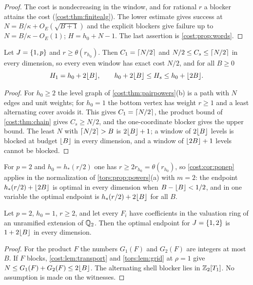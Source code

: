 \begin{proof}
The cost is nondecreasing in the window, and for rational $r$ a blocker attains the cost
(\cref{cost:thm:finitealg}). The lower estimate gives success at $N=B/\kappa+O_E(\sqrt{B+1})$
and the explicit blockers give failure up to $N=B/\kappa-O_E(1)$; $H=h_0+N-1$. The last
assertion is \cref{cost:prop:words}.
\end{proof}

\begin{corollary}[The first two powers, including $p=2$; \stU]\label{cost:cor:ponep}
Let $J=\{1,p\}$ and $r\ge\theta(r_{h_0})$. Then $C_1=\lceil N/2\rceil$ and
$N/2\le C_s\le\lceil N/2\rceil$ in every dimension, so every even window has exact cost $N/2$, and
for all $B\ge0$
\[
 H_1=h_0+2\lfloor B\rfloor,\qquad h_0+2\lfloor B\rfloor\le H_s\le h_0+\lfloor2B\rfloor .
\]
\end{corollary}

\begin{proof}
For $h_0\ge2$ the level graph of \cref{cost:thm:pairpowers}(b) is a path with $N$ edges and
unit weights; for $h_0=1$ the bottom vertex has weight $r\ge1$ and a least alternating cover
avoids it. This gives $C_1=\lceil N/2\rceil$, the product bound of \cref{cost:thm:chain} gives
$C_s\ge N/2$, and the one-coordinate blocker gives the upper bound. The least $N$ with
$\lceil N/2\rceil>B$ is $2\lfloor B\rfloor+1$; a window of $2\lfloor B\rfloor$ levels is blocked at budget
$\lfloor B\rfloor$ in every dimension, and a window of $\lfloor2B\rfloor+1$ levels cannot be blocked.
\end{proof}

For $p=2$ and $h_0=h_*(r/2)$ one has $r\ge2r_{h_0}=\theta(r_{h_0})$, so
\cref{cost:cor:ponep} applies in the normalization of \cref{tors:prop:powers}(a) with $m=2$:
the endpoint $h_*(r/2)+\lfloor2B\rfloor$ is optimal in every dimension when $B-\lfloor B\rfloor<1/2$, and
in one variable the optimal endpoint is $h_*(r/2)+2\lfloor B\rfloor$ for all $B$.

\begin{corollary}[Unramified coefficients at $p=2$; \stU]\label{cost:cor:unram}
Let $p=2$, $h_0=1$, $r\ge2$, and let every $F_i$ have coefficients in the valuation ring of
an unramified extension of $\mathbb{Q}_2$. Then the optimal endpoint for $J=\{1,2\}$ is
$1+2\lfloor B\rfloor$ in every dimension.
\end{corollary}

\begin{proof}
For the product $F$ the numbers $G_1(F)$ and $G_2(F)$ are integers at most $B$. If $F$
blocks, \cref{cost:lem:transport} and \cref{tors:lem:grid} at $\rho=1$ give
$N\le G_1(F)+G_2(F)\le2\lfloor B\rfloor$. The alternating shell blocker lies in $\mathbb{Z}_2[T_1]$. No
assumption is made on the witnesses.
\end{proof}


